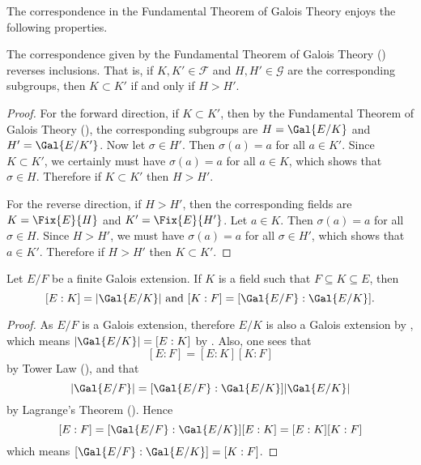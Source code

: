 The correspondence in the Fundamental Theorem of Galois Theory enjoys the following properties.

\begin{corollary}\label{corollary-fundamental-theorem-of-galois-theory-is-inclusion-reversing}
    The correspondence given by the Fundamental Theorem of Galois Theory () reverses inclusions. That is, if $K, K' \in \mathcal{F}$ and $H, H' \in \mathcal{G}$ are the corresponding subgroups, then $K \subset K'$ if and only if $H > H'$.
\end{corollary}
\begin{proof}
    For the forward direction, if $K \subset K'$, then by the Fundamental Theorem of Galois Theory (), the corresponding subgroups are $H = \Gal{E/K}$ and $H' = \Gal{E/K'}$. Now let $\sigma \in H'$. Then $\sigma(a) = a$ for all $a \in K'$. Since $K \subset K'$, we certainly must have $\sigma(a) = a$ for all $a \in K$, which shows that $\sigma \in H$. Therefore if $K \subset K'$ then $H > H'$.

    For the reverse direction, if $H > H'$, then the corresponding fields are $K = \Fix{E}{H}$ and $K' = \Fix{E}{H'}$. Let $a \in K$. Then $\sigma(a) = a$ for all $\sigma \in H$. Since $H > H'$, we must have $\sigma(a) = a$ for all $\sigma \in H'$, which shows that $a \in K'$. Therefore if $H > H'$ then $K \subset K'$.
\end{proof}

\begin{corollary}\label{corollary-intermediate-field-galois-field-order}
    Let $E/F$ be a finite Galois extension. If $K$ is a field such that $F \subseteq K \subseteq E$, then
    \[
        [E:K] = |\Gal{E/K}| \text{ and } [K:F] = [\Gal{E/F}:\Gal{E/K}].
    \]
\end{corollary}
\begin{proof}
    As $E/F$ is a Galois extension, therefore $E/K$ is also a Galois extension by , which means $|\Gal{E/K}| = [E:K]$ by . Also, one sees that
    \[
        [E:F] = [E:K][K:F]
    \]
    by Tower Law (), and that
    \[
        |\Gal{E/F}| = [\Gal{E/F}:\Gal{E/K}]|\Gal{E/K}|
    \]
    by Lagrange's Theorem (). Hence
    \[
        [E:F] = [\Gal{E/F}:\Gal{E/K}][E:K] = [E:K][K:F]
    \]
    which means $[\Gal{E/F}:\Gal{E/K}] = [K:F]$.
\end{proof}


